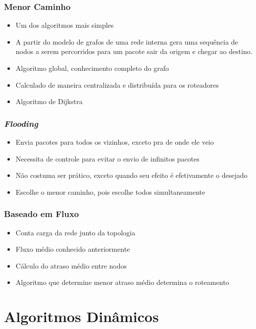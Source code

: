 \documentclass{beamer}
\begin{document}
\begin{frame}
\frametitle{Menor Caminho}

\begin{itemize}
  \setlength{\itemsep}{0.7cm}%
  \item Um dos algoritmos mais simples
  \item A partir do modelo de grafos de uma rede interna gera uma sequência de
  nodos a serem percorridos para um pacote sair da origem e chegar ao destino.
  \item Algoritmo global, conhecimento completo do grafo 
  \item Calculado de maneira centralizada e distribuída para os roteadores
  \item Algoritmo de Dijkstra
\end{itemize}
\end{frame}

\begin{frame}
\frametitle{\emph{Flooding}}

\begin{itemize}
  \setlength{\itemsep}{0.7cm}%
  \item Envia pacotes para todos os vizinhos, exceto pra de onde ele veio
  \item Necessita de controle para evitar o envio de infinitos pacotes
  \item Não costuma ser prático, exceto quando seu efeito é efetivamente o desejado
  \item Escolhe o menor caminho, pois escolhe todos simultaneamente 
\end{itemize}
\end{frame}

\begin{frame}
\frametitle{Baseado em Fluxo}
\begin{itemize}
  \setlength{\itemsep}{0.7cm}%
  \item Conta carga da rede junto da topologia
  \item Fluxo médio conhecido anteriormente
  \item Cálculo do atraso médio entre nodos
  \item Algoritmo que determine menor atraso médio determina o roteamento
\end{itemize}
\end{frame}


\section{Algoritmos Dinâmicos}
\end{document}
